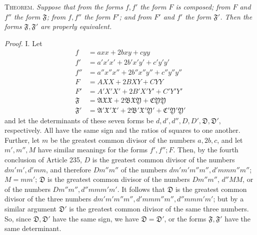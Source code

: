 \textsc{Theorem.} \textit{Suppose that from the forms $f,f'$ the form $F$ is composed; from $F$ and $f''$ the form $\mathfrak{F}$; from $f,f''$ the form $F'$; and from $F'$ and $f'$ the form $\mathfrak{F}'$. Then the forms $\mathfrak{F},\mathfrak{F}'$ are properly equivalent.}

\textit{Proof.} I. Let
\[
\begin{aligned}
f&=axx+2bxy+cyy\\
f'&=a'x'x'+2b'x'y'+c'y'y'\\
f''&=a''x''x''+2b''x''y''+c''y''y''\\
F&=AXX+2BXY+CYY\\
F'&=A'X'X'+2B'X'Y'+C'Y'Y'\\
\mathfrak{F}&=\mathfrak{A}\mathfrak{X}\mathfrak{X}+2\mathfrak{B}\mathfrak{X}\mathfrak{Y}+\mathfrak{C}\mathfrak{Y}\mathfrak{Y}\\
\mathfrak{F}'&=\mathfrak{A}'\mathfrak{X}'\mathfrak{X}'+2\mathfrak{B}'\mathfrak{X}'\mathfrak{Y}'+\mathfrak{C}'\mathfrak{Y}'\mathfrak{Y}'
\end{aligned}
\]
and let the determinants of these seven forms be $d,d',d'',D,D',\mathfrak{D},\mathfrak{D}'$, respectively. All have the same sign and the ratios of squares to one another. Further, let $m$ be the greatest common divisor of the numbers $a,2b,c$, and let $m',m'',M$ have similar meanings for the forms $f',f'';F$. Then, by the fourth conclusion of Article 235, $D$ is the greatest common divisor of the numbers $dm'm',d'mm$, and therefore $Dm''m''$ of the numbers $dm'm'm''m'',d'mmm''m''$; $M=mm'$; $\mathfrak{D}$ is the greatest common divisor of the numbers $Dm''m''$, $d''MM$, or of the numbers $Dm''m'',d''mmm'm'$. It follows that $\mathfrak{D}$ is the greatest common divisor of the three numbers $dm'm'm''m'',d'mmm''m'',d''mmm'm'$; but by a similar argument $\mathfrak{D}'$ is the greatest common divisor of the same three numbers. So, since $\mathfrak{D},\mathfrak{D}'$ have the same sign, we have $\mathfrak{D}=\mathfrak{D}'$, or the forms $\mathfrak{F},\mathfrak{F}'$ have the same determinant.

